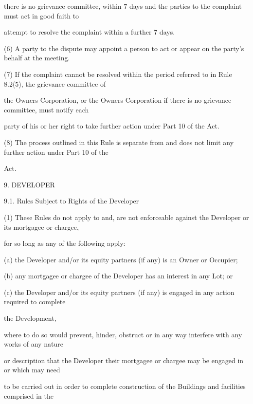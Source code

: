 \documentclass{article}
\begin{document}
{\fontsize{10.02}{1}there is no grievance committee, within 7 days and the parties to the complaint must act in good faith to }

{\fontsize{10.02}{1}attempt to resolve the complaint within a further 7 days. }

{\fontsize{9.962}{1}(6) A party to the dispute may appoint a person to act or appear on the party’s behalf at the meeting. }

{\fontsize{9.962}{1}(7) If the complaint cannot be resolved within the period referred to in Rule 8.2(5), the grievance committee of }

{\fontsize{10.02}{1}the Owners Corporation, or the Owners Corporation if there is no grievance committee, must notify each }

{\fontsize{10.02}{1}party of his or her right to take further action under Part 10 of the Act. }

{\fontsize{9.962}{1}(8) The process outlined in this Rule is separate from and does not limit any further action under Part 10 of the }

{\fontsize{10.02}{1}Act. }


{\fontsize{9.99}{1}9. DEVELOPER }

{\fontsize{9.99}{1}9.1. Rules Subject to Rights of the Developer }

{\fontsize{9.962}{1}(1) These Rules do not apply to and, are not enforceable against the Developer or its mortgagee or chargee, }

{\fontsize{10.02}{1}for so long as any of the following apply: }

{\fontsize{9.962}{1}(a) the Developer and/or its equity partners (if any) is an Owner or Occupier; }

{\fontsize{9.962}{1}(b) any mortgagee or chargee of the Developer has an interest in any Lot; or }

{\fontsize{9.962}{1}(c) the Developer and/or its equity partners (if any) is engaged in any action required to complete }

{\fontsize{10.02}{1}the Development, }

{\fontsize{10.02}{1}where to do so would prevent, hinder, obstruct or in any way interfere with any works of any nature }

{\fontsize{10.02}{1}or description that the Developer their mortgagee or chargee may be engaged in or which may need }

{\fontsize{10.02}{1}to be carried out in order to complete construction of the Buildings and facilities comprised in the }
\end{document}
